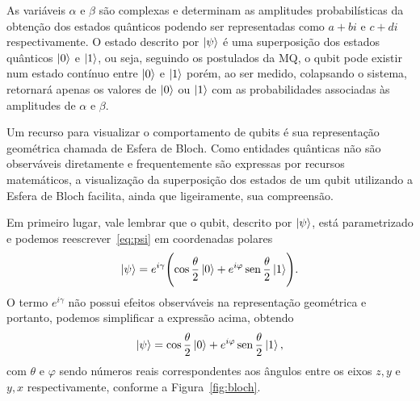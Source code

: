 As variáveis $\alpha$ e $\beta$ são complexas e determinam as amplitudes probabilísticas da obtenção dos estados quânticos podendo ser representadas como $a+bi$ e $c+di$ respectivamente. O estado descrito por $\ket{\psi}$ é uma superposição dos estados quânticos $\ket{0}$ e $\ket{1}$, ou seja, seguindo os postulados da MQ, o qubit pode existir num estado contínuo entre $\ket{0}$ e $\ket{1}$ porém, ao ser medido, colapsando o sistema, retornará apenas os valores de $\ket{0}$ ou $\ket{1}$ com as probabilidades associadas às amplitudes de $\alpha$ e $\beta$.

Um recurso para visualizar o comportamento de qubits é sua representação geométrica chamada de Esfera de Bloch. Como entidades quânticas não são observáveis diretamente e frequentemente são expressas por recursos matemáticos, a visualização da superposição dos estados de um qubit utilizando a Esfera de Bloch facilita, ainda que ligeiramente, sua compreensão.


Em primeiro lugar, vale lembrar que o qubit, descrito por $\ket{\psi}$, está parametrizado e podemos reescrever~\eqref{eq:psi} em coordenadas polares
\begin{equation}
\ket{\psi}=e^{i \gamma}\Biggl(\cos \frac{\theta}{2}\ket{0}+e^{i \varphi} \operatorname{sen} \frac{\theta}{2}\ket{1}\Biggr).
\end{equation}
O termo \(e^{i\gamma}\) não possui efeitos observáveis na representação geométrica e portanto, podemos simplificar a expressão acima, obtendo
\begin{equation}\label{eq:coordpolarpsi}
\ket{\psi}=\cos \frac{\theta}{2}\ket{0}+e^{i \varphi} \operatorname{sen} \frac{\theta}{2}\ket{1},
\end{equation}
com $\theta$ e $\varphi$ sendo números reais correspondentes aos ângulos entre os eixos $z, y$ e $y, x$ respectivamente, conforme a
Figura~\ref{fig:bloch}.


